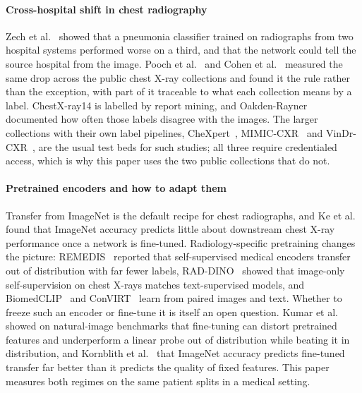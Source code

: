 \documentclass[conference]{IEEEtran}
\begin{document}
\paragraph{Cross-hospital shift in chest radiography}
Zech et al.~\cite{zech2018} showed that a pneumonia classifier trained on radiographs from two hospital systems performed worse on a third, and that the network could tell the source hospital from the image. Pooch et al.~\cite{pooch2020} and Cohen et al.~\cite{cohen2020limits} measured the same drop across the public chest X-ray collections and found it the rule rather than the exception, with part of it traceable to what each collection means by a label. ChestX-ray14 is labelled by report mining, and Oakden-Rayner~\cite{oakdenrayner2020} documented how often those labels disagree with the images. The larger collections with their own label pipelines, CheXpert~\cite{irvin2019}, MIMIC-CXR~\cite{johnson2019mimic} and VinDr-CXR~\cite{nguyen2022vindr}, are the usual test beds for such studies; all three require credentialed access, which is why this paper uses the two public collections that do not.

\paragraph{Pretrained encoders and how to adapt them}
Transfer from ImageNet is the default recipe for chest radiographs, and Ke et al.~\cite{ke2021chextransfer} found that ImageNet accuracy predicts little about downstream chest X-ray performance once a network is fine-tuned. Radiology-specific pretraining changes the picture: REMEDIS~\cite{azizi2023} reported that self-supervised medical encoders transfer out of distribution with far fewer labels, RAD-DINO~\cite{perezgarcia2025} showed that image-only self-supervision on chest X-rays matches text-supervised models, and BiomedCLIP~\cite{zhang2025biomedclip} and ConVIRT~\cite{zhang2022convirt} learn from paired images and text. Whether to freeze such an encoder or fine-tune it is itself an open question. Kumar et al.~\cite{kumar2022finetuning} showed on natural-image benchmarks that fine-tuning can distort pretrained features and underperform a linear probe out of distribution while beating it in distribution, and Kornblith et al.~\cite{kornblith2019} that ImageNet accuracy predicts fine-tuned transfer far better than it predicts the quality of fixed features. This paper measures both regimes on the same patient splits in a medical setting.
\end{document}
